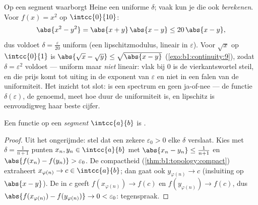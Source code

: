 \begin{example}\label{ex:b1:continuity:moduli}
Op een segment waarborgt Heine een uniforme $\delta$; vaak kun je die ook
\emph{berekenen}. Voor $f(x) = x^2$ op $\intcc{0}{10}$:
\[
\abs{x^2 - y^2} = \abs{x + y}\,\abs{x - y} \leq 20\,\abs{x - y},
\]
dus voldoet $\delta = \frac{\varepsilon}{20}$ uniform (een
lipschitzmodulus, lineair in $\varepsilon$). Voor $\sqrt x$ op
$\intcc{0}{1}$ is $\abs{\sqrt x - \sqrt y} \leq \sqrt{\abs{x - y}}$
(\cref{exo:b1:continuity:9}), zodat $\delta = \varepsilon^2$ voldoet ---
uniform maar \emph{niet} lineair: vlak bij $0$ is de vierkantswortel
steil, en die prijs komt tot uiting in de exponent van $\varepsilon$ en
niet in een falen van de uniformiteit. Het inzicht tot slot:  is een spectrum en geen ja-of-nee --- de functie
$\delta(\varepsilon)$, de  genoemd, meet hoe duur de uniformiteit
is, en lipschitz is eenvoudigweg haar beste cijfer.
\end{example}

\begin{theorem}[Heine]\label{thm:b1:continuity:heine}
Een  functie op een \emph{segment} $\intcc{a}{b}$ is .
\end{theorem}

\begin{proof}
Uit het ongerijmde: stel dat een zekere $\varepsilon_0 > 0$ elke $\delta$
verslaat. Kies met $\delta = \frac{1}{n+1}$ punten $x_n, y_n \in
\intcc{a}{b}$ met $\abs{x_n - y_n} \leq \frac{1}{n+1}$ en $\abs{f(x_n) -
f(y_n)} > \varepsilon_0$. De compactheid
(\cref{thm:b1:topology:compact}) extraheert $x_{\varphi(n)} \to c \in
\intcc{a}{b}$; dan gaat ook $y_{\varphi(n)} \to c$ (insluiting op $\abs{x
- y}$). De  in $c$ geeft $f(x_{\varphi(n)}) \to f(c)$ en
$f(y_{\varphi(n)}) \to f(c)$, dus $\abs{f(x_{\varphi(n)}) -
f(y_{\varphi(n)})} \to 0 < \varepsilon_0$: tegenspraak.
\end{proof}

